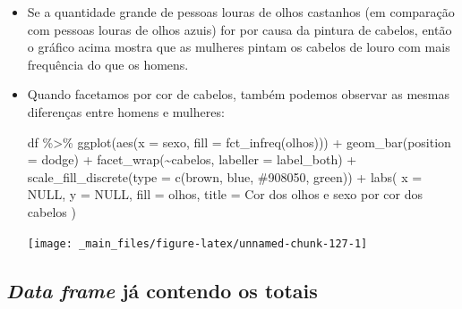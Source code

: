 \documentclass[
  11pt]{report}
\newenvironment{Shaded}{\begin{snugshade}}{\end{snugshade}}
\newcommand{\AttributeTok}[1]{\textcolor[rgb]{0.77,0.63,0.00}{#1}}
\newcommand{\ConstantTok}[1]{\textcolor[rgb]{0.00,0.00,0.00}{#1}}
\newcommand{\FunctionTok}[1]{\textcolor[rgb]{0.00,0.00,0.00}{#1}}
\newcommand{\NormalTok}[1]{#1}
\newcommand{\SpecialCharTok}[1]{\textcolor[rgb]{0.00,0.00,0.00}{#1}}
\newcommand{\StringTok}[1]{\textcolor[rgb]{0.31,0.60,0.02}{#1}}
\renewenvironment{Shaded}{
    \begin{mdframed}[%
      roundcorner=2pt,%
      innerleftmargin=5pt,%
      innerrightmargin=5pt,%
      topline=true,%
      leftline=true,%
      rightline=true,%
      bottomline=true,%
      linewidth=0.5pt,%
      linecolor=black!20,%
      backgroundcolor=black!2,%
      skipabove=2ex,%
      skipbelow=2.5ex%
    ]%
  }
  {
    \end{mdframed}
  }
\begin{document}
\begin{itemize}
\item
  Se a quantidade grande de pessoas louras de olhos castanhos (em comparação com pessoas louras de olhos azuis) for por causa da pintura de cabelos, então o gráfico acima mostra que as mulheres pintam os cabelos de louro com mais frequência do que os homens.
\item
  Quando facetamos por cor de cabelos, também podemos observar as mesmas diferenças entre homens e mulheres:

\begin{Shaded}
\begin{Highlighting}[]
\NormalTok{df }\SpecialCharTok{\%\textgreater{}\%} 
  \FunctionTok{ggplot}\NormalTok{(}\FunctionTok{aes}\NormalTok{(}\AttributeTok{x =}\NormalTok{ sexo, }\AttributeTok{fill =} \FunctionTok{fct\_infreq}\NormalTok{(olhos))) }\SpecialCharTok{+}
    \FunctionTok{geom\_bar}\NormalTok{(}\AttributeTok{position =} \StringTok{\textquotesingle{}dodge\textquotesingle{}}\NormalTok{) }\SpecialCharTok{+}
    \FunctionTok{facet\_wrap}\NormalTok{(}\SpecialCharTok{\textasciitilde{}}\NormalTok{cabelos, }\AttributeTok{labeller =}\NormalTok{ label\_both) }\SpecialCharTok{+}
    \FunctionTok{scale\_fill\_discrete}\NormalTok{(}\AttributeTok{type =} \FunctionTok{c}\NormalTok{(}\StringTok{\textquotesingle{}brown\textquotesingle{}}\NormalTok{, }\StringTok{\textquotesingle{}blue\textquotesingle{}}\NormalTok{, }\StringTok{\textquotesingle{}\#908050\textquotesingle{}}\NormalTok{, }\StringTok{\textquotesingle{}green\textquotesingle{}}\NormalTok{)) }\SpecialCharTok{+}
    \FunctionTok{labs}\NormalTok{(}
      \AttributeTok{x =} \ConstantTok{NULL}\NormalTok{,}
      \AttributeTok{y =} \ConstantTok{NULL}\NormalTok{,}
      \AttributeTok{fill =} \StringTok{\textquotesingle{}olhos\textquotesingle{}}\NormalTok{,}
      \AttributeTok{title =} \StringTok{\textquotesingle{}Cor dos olhos e sexo por cor dos cabelos\textquotesingle{}}
\NormalTok{    )}
\end{Highlighting}
\end{Shaded}

  \begin{center}\texttt{[image: \_main\_files/figure-latex/unnamed-chunk-127-1]} \end{center}
\end{itemize}

\hypertarget{data-frame-juxe1-contendo-os-totais}{%
\subsection{\texorpdfstring{\emph{Data frame} já contendo os totais}{Data frame já contendo os totais}}\label{data-frame-juxe1-contendo-os-totais}}
\end{document}

